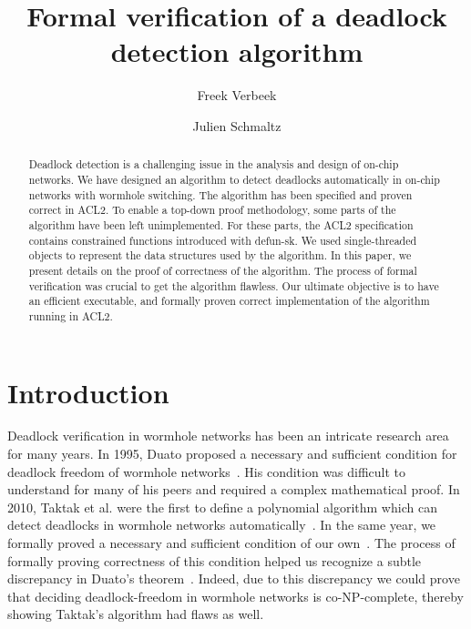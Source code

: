 \documentclass[submission,copyright]{eptcs}
\begin{document}
\title{Formal verification of a deadlock detection algorithm}
\def\titlerunning{Formal verification of a deadlock detection algorithm}
\author{Freek Verbeek
\and
Julien Schmaltz 
}
\def\authorrunning{Freek Verbeek and Julien Schmaltz}

\maketitle
\begin{abstract}
Deadlock detection is a challenging issue in the analysis and design of on-chip networks. We have designed an algorithm to detect deadlocks automatically in on-chip networks with wormhole switching. The algorithm has been specified and proven correct in ACL2. To enable a top-down proof methodology, some parts of the algorithm have been left unimplemented. For these parts, the ACL2 specification contains constrained functions introduced with defun-sk. We used single-threaded objects to represent the data structures used by the algorithm. In this paper, we present details on the proof of correctness of the algorithm. The process of formal verification was crucial to get the algorithm flawless.
Our ultimate objective is to have an efficient executable, and formally proven correct implementation of the algorithm running in ACL2.
\end{abstract}



\section{Introduction}

Deadlock verification in wormhole networks has been an intricate research area for many years. 
In 1995, Duato proposed a necessary and sufficient condition for deadlock freedom of wormhole networks~\cite{duato95}.
His condition was difficult to understand for many of his peers and required a complex mathematical proof.
In 2010, Taktak et al. were the first to define a polynomial algorithm which can detect deadlocks in wormhole networks automatically~\cite{taktak10}.
In the same year, we formally proved a necessary and sufficient condition of our own~\cite{verbeekschmaltz:tpds10}.
The process of formally proving correctness of this condition helped us recognize a subtle discrepancy in Duato's theorem~\cite{TPDScomment}.
Indeed, due to this discrepancy we could prove that deciding deadlock-freedom in wormhole networks is co-NP-complete, thereby showing Taktak's algorithm had flaws as well.
\end{document}
